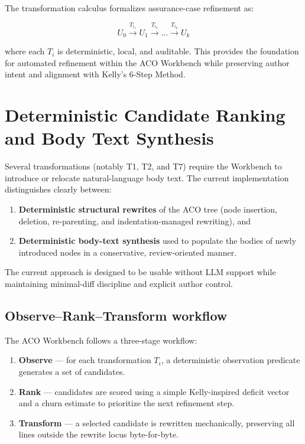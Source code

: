 \documentclass[12pt,twoside,a4paper]{article}
\begin{document}
The transformation calculus formalizes assurance-case refinement as:

\[
U_0 \xrightarrow{T_{i_1}} U_1 \xrightarrow{T_{i_2}} \dots \xrightarrow{T_{i_k}} U_k
\]

where each $T_i$ is deterministic, local, and auditable.  
This provides the foundation for automated refinement within the ACO Workbench while preserving author intent and alignment with Kelly’s 6-Step Method.


\section{Deterministic Candidate Ranking and Body Text Synthesis}

Several transformations (notably T1, T2, and T7) require the Workbench to introduce or relocate natural-language body text. The current implementation distinguishes clearly between:

\begin{enumerate}
  \item \textbf{Deterministic structural rewrites} of the ACO tree (node insertion, deletion, re-parenting, and indentation-managed rewriting), and
  \item \textbf{Deterministic body-text synthesis} used to populate the bodies of newly introduced nodes in a conservative, review-oriented manner.
\end{enumerate}

The current approach is designed to be usable without LLM support while maintaining minimal-diff discipline and explicit author control.

\subsection{Observe--Rank--Transform workflow}

The ACO Workbench follows a three-stage workflow:

\begin{enumerate}
  \item \textbf{Observe} --- for each transformation $T_i$, a deterministic observation predicate generates a set of candidates.
  \item \textbf{Rank} --- candidates are scored using a simple Kelly-inspired deficit vector and a churn estimate to prioritize the next refinement step.
  \item \textbf{Transform} --- a selected candidate is rewritten mechanically, preserving all lines outside the rewrite locus byte-for-byte.
\end{enumerate}
\end{document}

